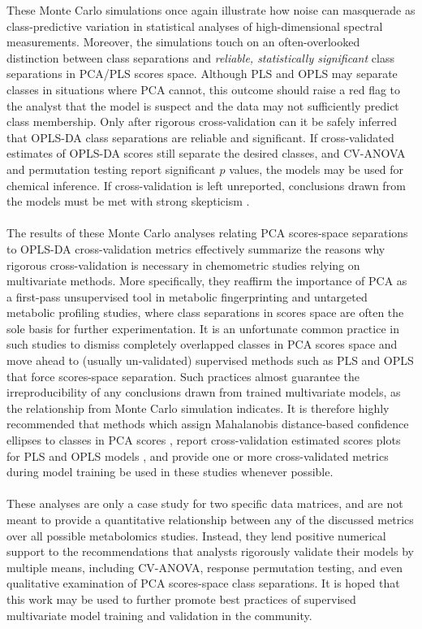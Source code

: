 \begin{doublespace}
These Monte Carlo simulations once again illustrate how noise can masquerade
as class-predictive variation in statistical analyses of high-dimensional
spectral measurements. Moreover, the simulations touch on an often-overlooked
distinction between class separations and
\emph{reliable, statistically significant} class separations in PCA/PLS scores
space. Although PLS and OPLS may separate classes in situations where PCA
cannot, this outcome should raise a red flag to the analyst that the model
is suspect and the data may not sufficiently predict class membership. Only
after rigorous cross-validation can it be safely inferred that OPLS-DA class
separations are reliable and significant. If cross-validated estimates of
OPLS-DA scores still separate the desired classes, and CV-ANOVA and permutation
testing report significant $p$ values, the models may be used for chemical
inference. If cross-validation is left unreported, conclusions drawn from the
models must be met with strong skepticism \cite{westerhuis:metab2008a,
  brereton:jchemo2014b}.
\\\\
The results of these Monte Carlo analyses relating PCA scores-space separations
to OPLS-DA cross-validation metrics effectively summarize the reasons why
rigorous cross-validation is necessary in chemometric studies relying on
multivariate methods. More specifically, they reaffirm the importance of PCA
as a first-pass unsupervised tool in metabolic fingerprinting and untargeted
metabolic profiling studies, where class separations in scores space are often
the sole basis for further experimentation. It is an unfortunate common
practice in such studies to dismiss completely overlapped classes in PCA scores
space and move ahead to (usually un-validated) supervised methods such as PLS
and OPLS that force scores-space separation. Such practices almost guarantee
the irreproducibility of any conclusions drawn from trained multivariate
models, as the relationship from Monte Carlo simulation indicates. It is
therefore highly recommended that methods which assign Mahalanobis
distance-based confidence ellipses to classes in PCA scores
\cite{worley:abio2013}, report cross-validation estimated scores plots for
PLS and OPLS models \cite{westerhuis:metab2008a}, and provide one or more
cross-validated metrics during model training \cite{worley:acscb2014} be used
in these studies whenever possible.
\\\\
These analyses are only a case study for two specific data matrices, and are
not meant to provide a quantitative relationship between any of the discussed
metrics over all possible metabolomics studies. Instead, they lend positive
numerical support to the recommendations that analysts rigorously validate
their models by multiple means, including CV-ANOVA, response permutation
testing, and even qualitative examination of PCA scores-space class
separations. It is hoped that this work may be used to further promote
best practices of supervised multivariate model training and validation in
the community.
\end{doublespace}




